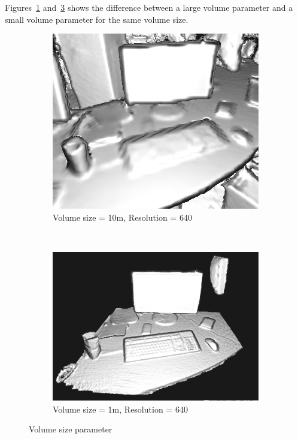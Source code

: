 \documentclass[12pt]{article}
\begin{document}
Figures~\ref{fig:largevol} and~\ref{fig:smallvol} shows the difference between a large volume parameter and a small volume parameter for the same volume size.

\begin{figure}[h]
        \centering
        \begin{subfigure}[t]{0.45\textwidth}
                \includegraphics[width=1\textwidth]{VolLarge.png}
                \caption{Volume size = 10m, Resolution = 640}
                \label{fig:largevol}
        \end{subfigure}~
        \begin{subfigure}[t]{0.45\textwidth}
                \includegraphics[width=1\textwidth]{VolSmall.png}
                \caption{Volume size = 1m, Resolution = 640}
                \label{fig:smallvol}
        \end{subfigure}
        \caption{Volume size parameter}
        \par
\end{figure}
\end{document}
